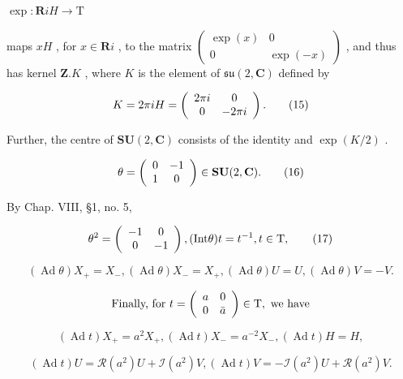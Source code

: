 \(\exp : \mathbf{R}iH \to \mathrm{T}\)

maps \(xH\) , for \(x \in \mathbf{R}i\) , to the matrix \(\left( \begin{array}{cc}\exp (x) & 0\\ 0 & \exp (-x) \end{array} \right)\) , and thus has kernel \(\mathbf{Z}.K\) , where \(K\) is the element of \(\mathfrak{su}(2,\mathbf{C})\) defined by

\[
K = 2 \pi i H = \left( \begin{array}{c c} 2 \pi i & 0 \\ 0 & - 2 \pi i \end{array} \right).\tag{15}
\]

Further, the centre of \(\mathbf{SU}(2,\mathbf{C})\) consists of the identity and \(\exp (K / 2)\) .

\[
\theta = \left( \begin{array}{c c} 0 & - 1 \\ 1 & 0 \end{array} \right) \in \mathbf {S U} (2, \mathbf {C}).\tag{16}
\]

By Chap. VIII, §1, no. 5,

\[
\theta^ {2} = \left( \begin{array}{c c} - 1 & 0 \\ 0 & - 1 \end{array} \right), (\text {Int}   \theta) t = t ^ {- 1}, t \in \text {T},\tag{17}
\]

\[
(\operatorname{Ad} \theta) X _ {+} = X _ {-}, (\operatorname{Ad} \theta) X _ {-} = X _ {+}, (\operatorname{Ad} \theta) U = U, (\operatorname{Ad} \theta) V = - V.\tag{18}
\]

\[
\text {   Finally,   for   } t = \left( \begin{array}{c c} a & 0 \\ 0 & \bar {a} \end{array} \right) \in \mathrm{T}, \text {   we   have   }
\]

\[
(\operatorname{Ad} t) X _ {+} = a ^ {2} X _ {+}, (\operatorname{Ad} t) X _ {-} = a ^ {- 2} X _ {-}, (\operatorname{Ad} t) H = H,\tag{19}
\]

\[
(\operatorname{Ad} t) U = \mathcal {R} (a ^ {2}) U + \mathcal {I} (a ^ {2}) V, (\operatorname{Ad} t) V = - \mathcal {I} (a ^ {2}) U + \mathcal {R} (a ^ {2}) V.\tag{20}
\]

